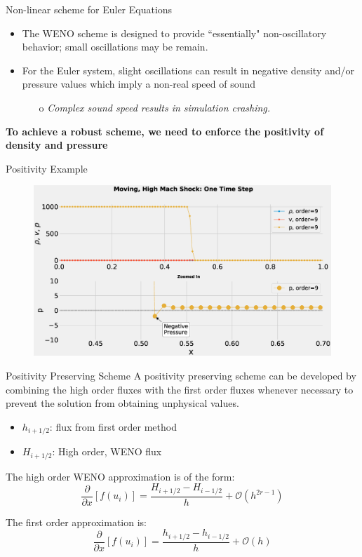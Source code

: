 \documentclass[10pt]{beamer}
\begin{document}
\begin{frame}{Non-linear scheme for Euler Equations}
  \begin{itemize}
    \item The WENO scheme is designed to provide ``essentially" non-oscillatory behavior; small oscillations may be remain.
    \item For the Euler system, slight oscillations can result in negative density and/or pressure values which imply a non-real speed of sound
    \begin{itemize}
      \item[o] \textit{Complex sound speed results in simulation crashing.}
    \end{itemize}  
  \end{itemize}
  \textbf{To achieve a robust scheme, we need to enforce the positivity of density and pressure}
\end{frame}

\begin{frame}{Positivity Example}
  \begin{figure}[H]
    \centering
    \includegraphics[scale=0.275]{PositivityZoom.eps}
    \end{figure}
\end{frame}


\begin{frame}{Positivity Preserving Scheme}
  A positivity preserving scheme can be developed by combining the high order fluxes with the first order fluxes whenever necessary to prevent the solution from obtaining unphysical values.
  \begin{itemize}
    \item $h_{i+1/2}$: flux from first order method
    \item $H_{i+1/2}$: High order, WENO flux
  \end{itemize}
  
  The high order WENO approximation is of the form:
  $$
  \frac{\partial}{\partial x}[f(u_i)] = \frac{H_{i+1 /2} - H_{i-1/2}}{h}+\mathcal{O}(h^{2r-1})
  $$

  The first order approximation is:
  $$
  \frac{\partial}{\partial x}[f(u_i)] = \frac{h_{i+1 /2} - h_{i-1/2}}{h}+\mathcal{O}(h)
  $$
\end{frame}
\end{document}
